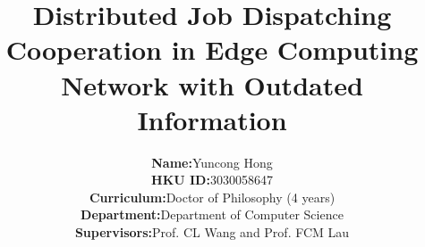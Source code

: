 \documentclass[journal, 12pt, onecolumn, draftclsnofoot]{IEEEtran}
\theoremstyle{definition}             %
\theoremstyle{remark}                 %
\theoremstyle{plain}                  %
\begin{document}
    \title{
        Distributed Job Dispatching Cooperation in Edge Computing Network with Outdated Information
    }

    \author{
        \begin{tabular}{rl}
            \textbf{Name: }&                Yuncong Hong \\
            \textbf{HKU ID:}&               3030058647 \\
            \textbf{Curriculum:}&           Doctor of Philosophy (4 years) \\
            \textbf{Department:}&           Department of Computer Science \\
            \textbf{Supervisors:}&          Prof. CL Wang and Prof. FCM Lau 
        \end{tabular}
    }

    \maketitle
    {
        \fancyhf{}
    }
    \thispagestyle{firststyle}
    

    
    

    
    

    
    
    
    

    
    

\end{document}
